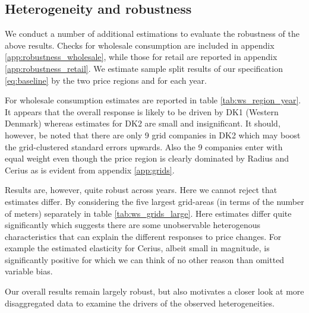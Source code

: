 \subsection{Heterogeneity and robustness}
\label{subsec:r_robustness}
\begin{comment}
Heterogeneous effects
\begin{figure}[H]
  \centering
  \caption{Wholesale elasticity by hour}
  \label{fig:ws_elasticity_hour}
\end{figure}

\begin{figure}[H]
  \centering
  \caption{Wholesale peak-elasticity by log grid size}
  \label{fig:ws_elasticity_grid}
\end{figure}
\end{comment}
We conduct a number of additional estimations to evaluate the robustness of the above results. Checks for wholesale consumption are included in appendix \ref{app:robustness_wholesale}, while those for retail are reported in appendix \ref{app:robustness_retail}. We estimate sample split results of our specification \eqref{eq:baseline} by the two price regions and for each year.
\bigskip\par
For wholesale consumption estimates are reported in table \ref{tab:ws_region_year}. It appears that the overall response is likely to be driven by DK1 (Western Denmark) whereas estimates for DK2 are small and insignificant. It should, however, be noted that there are only 9 grid companies in DK2 which may boost the grid-clustered standard errors upwards. Also the 9 companies enter with equal weight even though the price region is clearly dominated by Radius and Cerius as is evident from appendix \ref{app:grids}.
\par
Results are, however, quite robust across years. Here we cannot reject that estimates differ. By considering the five largest grid-areas (in terms of the number of meters) separately in table \ref{tab:ws_grids_large}. Here estimates differ quite significantly which suggests there are some unobservable heterogenous characteristics that can explain the different responses to price changes. For example the estimated elasticity for Cerius, albeit small in magnitude, is significantly positive for which we can think of no other reason than omitted variable bias. %
\bigskip\par


\bigskip\par
Our overall results remain largely robust, but also motivates a closer look at more disaggregated data to examine the drivers of the observed heterogeneities.

